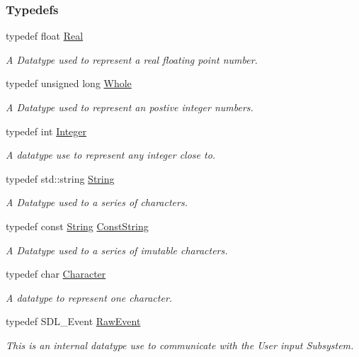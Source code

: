 \subsubsection*{Typedefs}
\begin{DoxyCompactItemize}
\item 
typedef float \hyperlink{namespacephys_af7eb897198d265b8e868f45240230d5f}{Real}
\begin{DoxyCompactList}\small\item\em A Datatype used to represent a real floating point number. \item\end{DoxyCompactList}\item 
typedef unsigned long \hyperlink{namespacephys_a460f6bc24c8dd347b05e0366ae34f34a}{Whole}
\begin{DoxyCompactList}\small\item\em A Datatype used to represent an postive integer numbers. \item\end{DoxyCompactList}\item 
typedef int \hyperlink{namespacephys_a7f09bf5585b2bb97613cd9aad4273a81}{Integer}
\begin{DoxyCompactList}\small\item\em A datatype use to represent any integer close to. \item\end{DoxyCompactList}\item 
typedef std::string \hyperlink{namespacephys_aa03900411993de7fbfec4789bc1d392e}{String}
\begin{DoxyCompactList}\small\item\em A Datatype used to a series of characters. \item\end{DoxyCompactList}\item 
typedef const \hyperlink{namespacephys_aa03900411993de7fbfec4789bc1d392e}{String} \hyperlink{namespacephys_a5ce5049f8b4bf88d6413c47b504ebb31}{ConstString}
\begin{DoxyCompactList}\small\item\em A Datatype used to a series of imutable characters. \item\end{DoxyCompactList}\item 
typedef char \hyperlink{namespacephys_a3098bae5b0a3cd16eec331f766cc562b}{Character}
\begin{DoxyCompactList}\small\item\em A datatype to represent one character. \item\end{DoxyCompactList}\item 
typedef SDL\_\-Event \hyperlink{namespacephys_a8126d26e4507e66d09876988bb941fd4}{RawEvent}
\begin{DoxyCompactList}\small\item\em This is an internal datatype use to communicate with the User input Subsystem. \item\end{DoxyCompactList}\end{DoxyCompactItemize}
